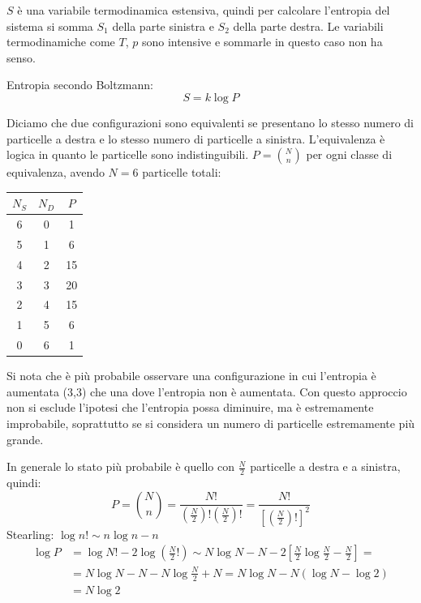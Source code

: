 $S$ è una variabile termodinamica estensiva, quindi per calcolare l'entropia del sistema si somma $S_1$ della parte sinistra e $S_2$ della parte destra. Le variabili termodinamiche come $T$, $p$ sono intensive e sommarle in questo caso non ha senso.
\begin{legge}
   Entropia secondo Boltzmann:
   \begin{equation}
      S=k\log P
   \end{equation}
\end{legge}
Diciamo che due configurazioni sono equivalenti se presentano lo stesso numero di particelle a destra e lo stesso numero di particelle a sinistra. L'equivalenza è logica in quanto le particelle sono indistinguibili. $P=\binom{N}{n}$ per ogni classe di equivalenza, avendo $N=6$ particelle totali:
\begin{center}
   \begin{tabular}{c|c|c}
      $N_S$ & $N_D$ & $P$ \\
      \hline
      6     & 0     & 1   \\
      5     & 1     & 6   \\
      4     & 2     & 15  \\
      3     & 3     & 20  \\
      2     & 4     & 15  \\
      1     & 5     & 6   \\
      0     & 6     & 1   \\
   \end{tabular}
\end{center}
Si nota che è più probabile osservare una configurazione in cui l'entropia è aumentata (3,3) che una dove l'entropia non è aumentata. Con questo approccio non si esclude l'ipotesi che l'entropia possa diminuire, ma è estremamente improbabile, soprattutto se si considera un numero di particelle estremamente più grande.

In generale lo stato più probabile è quello con $\frac{N}{2}$ particelle a destra e a sinistra, quindi:
\[P=\binom{N}{n}=\frac{N!}{\left(\frac{N}{2}\right)!\left(\frac{N}{2}\right)!}=\frac{N!}{\left[\left(\frac{N}{2}\right)!\right]^2}\]
Stearling: $\log n!\sim n\log n-n$
\begin{align*}
   \log P & =\log N!-2\log\left(\frac{N}{2}!\right)\sim N\log N-N-2\left[\frac{N}{2}\log\frac{N}{2}-\frac{N}{2}\right]= \\
          & =N\log N-N-N\log\frac{N}{2}+N=N\log N-N\left(\log N-\log 2\right)                                           \\
          & =N\log 2
\end{align*}

